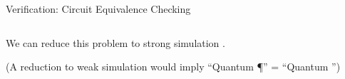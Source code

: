 \begin{refsection}
\begin{frame}{Verification: Circuit Equivalence Checking}

\vfill

\centering


\begin{columns}
\begin{column}{.05\textwidth}
\end{column}
\begin{column}{.4\textwidth}
\end{column}
\begin{column}{.08\textwidth}
\hspace{-.em}
\end{column}
\begin{column}{.4\textwidth}
\end{column}
\begin{column}{.05\textwidth}
\end{column}
\end{columns}

\vspace{.5cm}


\pause


We can reduce this problem to \alert{strong} simulation \cite{thanos2023fast}.

(A reduction to weak simulation would imply ``Quantum \P'' = ``Quantum \NP'')


\vfill

\printbibliography[section=\therefsection]
\end{frame}
\end{refsection}





